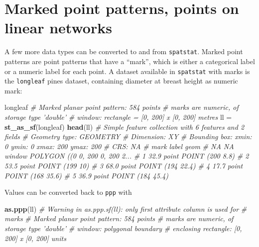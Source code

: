\documentclass[]{book}
\newenvironment{Shaded}{\begin{snugshade}}{\end{snugshade}}
\newcommand{\CommentTok}[1]{\textcolor[rgb]{0.56,0.35,0.01}{\textit{#1}}}
\newcommand{\KeywordTok}[1]{\textcolor[rgb]{0.13,0.29,0.53}{\textbf{#1}}}
\newcommand{\NormalTok}[1]{#1}
\newcommand{\StringTok}[1]{\textcolor[rgb]{0.31,0.60,0.02}{#1}}
\begin{document}
\hypertarget{marked-point-patterns-points-on-linear-networks}{%
\section{Marked point patterns, points on linear networks}\label{marked-point-patterns-points-on-linear-networks}}

A few more data types can be converted to and from \texttt{spatstat}.
Marked point patterns are point patterns that have a ``mark'', which
is either a categorical label or a numeric label for each point.
A dataset available in \texttt{spatstat} with marks is the \texttt{longleaf} pines
dataset, containing diameter at breast height as numeric mark:

\begin{Shaded}
\begin{Highlighting}[]
\NormalTok{longleaf}
\CommentTok{# Marked planar point pattern: 584 points}
\CommentTok{# marks are numeric, of storage type  'double'}
\CommentTok{# window: rectangle = [0, 200] x [0, 200] metres}
\NormalTok{ll =}\StringTok{ }\KeywordTok{st_as_sf}\NormalTok{(longleaf)}
\KeywordTok{head}\NormalTok{(ll)}
\CommentTok{# Simple feature collection with 6 features and 2 fields}
\CommentTok{# Geometry type: GEOMETRY}
\CommentTok{# Dimension:     XY}
\CommentTok{# Bounding box:  xmin: 0 ymin: 0 xmax: 200 ymax: 200}
\CommentTok{# CRS:           NA}
\CommentTok{#    mark  label                           geom}
\CommentTok{# NA   NA window POLYGON ((0 0, 200 0, 200 2...}
\CommentTok{# 1  32.9  point                POINT (200 8.8)}
\CommentTok{# 2  53.5  point                 POINT (199 10)}
\CommentTok{# 3  68.0  point               POINT (194 22.4)}
\CommentTok{# 4  17.7  point               POINT (168 35.6)}
\CommentTok{# 5  36.9  point               POINT (184 45.4)}
\end{Highlighting}
\end{Shaded}

Values can be converted back to \texttt{ppp} with

\begin{Shaded}
\begin{Highlighting}[]
\KeywordTok{as.ppp}\NormalTok{(ll)}
\CommentTok{# Warning in as.ppp.sf(ll): only first attribute column is used for}
\CommentTok{# marks}
\CommentTok{# Marked planar point pattern: 584 points}
\CommentTok{# marks are numeric, of storage type  'double'}
\CommentTok{# window: polygonal boundary}
\CommentTok{# enclosing rectangle: [0, 200] x [0, 200] units}
\end{Highlighting}
\end{Shaded}
\end{document}
